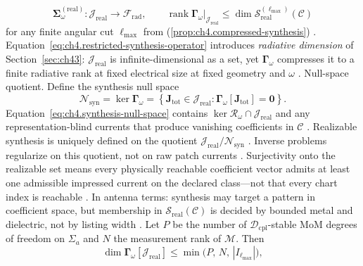 \begin{equation}
\label{eq:ch4.restricted-synthesis-operator}
\boldsymbol{\Sigma}_\omega^{(\mathrm{real})}:
\mathcal{J}_{\mathrm{real}}\to\mathcal{F}_{\mathrm{rad}},
\qquad
\operatorname{rank}\boldsymbol{\Gamma}_\omega|_{\mathcal{J}_{\mathrm{real}}}
\le
\dim\mathcal{S}_{\mathrm{real}}^{(\ell_{\max})}(\mathcal{C})
\end{equation}
for any finite angular cut \(\ell_{\max}\) from (\ref{prop:ch4.compressed-synthesis})
\cite{hansen1988}. Equation~\eqref{eq:ch4.restricted-synthesis-operator} introduces
\emph{radiative dimension} of Section~\ref{sec:ch43}: \(\mathcal{J}_{\mathrm{real}}\) is infinite-dimensional as
a set, yet \(\boldsymbol{\Gamma}_\omega\) compresses it to a finite radiative rank at fixed electrical size at fixed geometry and
\(\omega\) \cite{stratton1941}.
Null-space quotient. Define the synthesis null space
\begin{equation}
\label{eq:ch4.synthesis-null-space}
\mathcal{N}_{\mathrm{syn}}
=
\ker\boldsymbol{\Gamma}_\omega
=
\left\{
\mathbf{J}_{\mathrm{tot}}\in\mathcal{J}_{\mathrm{real}}:
\boldsymbol{\Gamma}_\omega[\mathbf{J}_{\mathrm{tot}}]=\mathbf{0}
\right\}.
\end{equation}
Equation~\eqref{eq:ch4.synthesis-null-space} contains \(\ker\mathcal{R}_\omega\cap\mathcal{J}_{\mathrm{real}}\) and
any representation-blind currents that produce vanishing coefficients in \(\mathcal{C}\) \cite{stratton1941}.
Realizable synthesis is uniquely defined on the quotient \(\mathcal{J}_{\mathrm{real}}/\mathcal{N}_{\mathrm{syn}}\)
\cite{devaney2004}. Inverse problems regularize on this quotient, not on raw patch currents
\cite{harrington2001}.
Surjectivity onto the realizable set means every physically reachable coefficient vector admits at least one admissible impressed current on the declared class---not that every chart index is reachable \cite{devaney2004}. In antenna terms: synthesis may target a pattern in coefficient space, but membership in $\mathcal{S}_{\mathrm{real}}(\mathcal{C})$ is decided by bounded metal and dielectric, not by listing width \cite{stratton1941}.
\label{cor:ch4.channel-count}
Let \(P\) be the number of \(\mathcal{D}_{\mathrm{cpl}}\)-stable MoM degrees of freedom on \(\Sigma_{a}\) and
\(N\) the measurement rank of \(\mathcal{M}\). Then
\begin{equation}
\label{eq:ch4.channel-count-bound}
\dim\boldsymbol{\Gamma}_\omega[\mathcal{J}_{\mathrm{real}}]
\le
\min\big(P,\,N,\,|I_{\ell_{\max}}|\big),
\end{equation}

